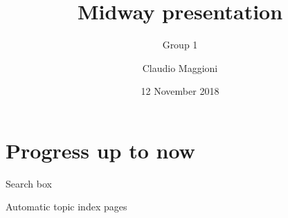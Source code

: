 \documentclass[10pt]{beamer}
\title{Midway presentation}
\subtitle{Group 1}
\date{12 November 2018}
\author{Claudio Maggioni}
\begin{document}
\maketitle

\begin{frame}[standout]
\centering{\Huge\LaTeX}
\end{frame}

\section{Progress up to now}

\begin{frame}[fragile]{Search box}
\vfill{}\vfill
\end{frame}

\begin{frame}[fragile]{Automatic topic index pages}
\vfill{}\vfill
\end{frame}
\end{document}
